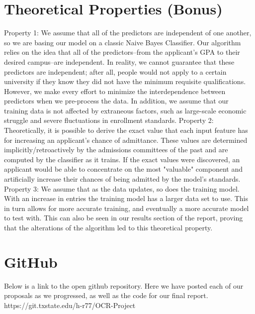 \documentclass{article}
\begin{document}
\section{Theoretical Properties (Bonus)}
Property 1: We assume that all of the predictors are independent of one another, so we are basing our model on a classic Naive Bayes Classifier. Our algorithm relies on the idea that all of the predictors--from the applicant's GPA to their desired campus--are independent. In reality, we cannot guarantee that these predictors are independent; after all, people would not apply to a certain university if they know they did not have the minimum requisite qualifications. However, we make every effort to minimize the interdependence between predictors when we pre-process the data. In addition, we assume that our training data is not affected by extraneous factors, such as large-scale economic struggle and severe fluctuations in enrollment standards. \newline\newline\indent
Property 2: Theoretically, it is possible to derive the exact value that each input feature has for increasing an applicant's chance of admittance. These values are determined implicitly/retroactively by the admissions committees of the past and are computed by the classifier as it trains. If the exact values were discovered, an applicant would be able to concentrate on the most "valuable" component and artificially increase their chances of being admitted by the model's standards. \newline\newline\indent
Property 3: We assume that as the data updates, so does the training model. With an increase in entries the training model has a larger data set to use. This in turn allows for more accurate training, and eventually a more accurate model to test with. This can also be seen in our results section of the report, proving that the alterations of the algorithm led to this theoretical property.
\section{GitHub} \noindent
Below is a link to the open github repository. Here we have posted each of our proposals as we progressed, as well as the code for our final report. \newline\newline \indent
https://git.txstate.edu/h-r77/OCR-Project



\end{document}
